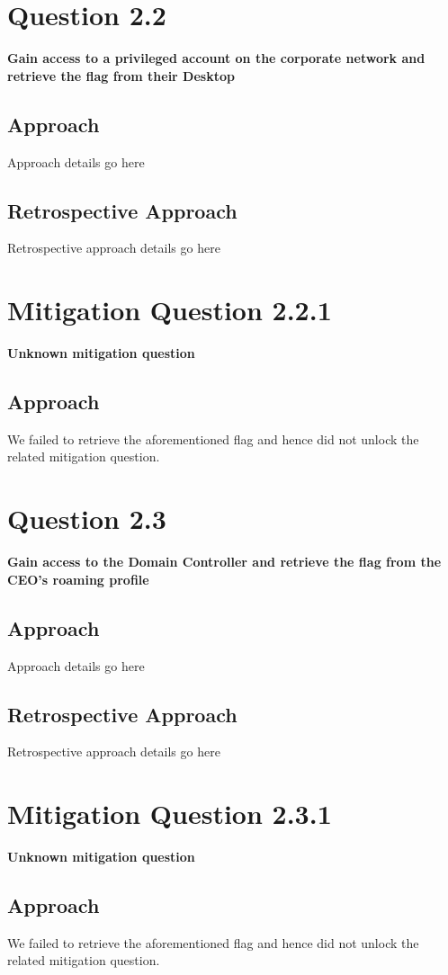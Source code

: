 \section{Question 2.2}
\textbf{Gain access to a privileged account on the corporate network and
retrieve the flag from their Desktop}
\subsection{Approach}
Approach details go here
\subsection{Retrospective Approach}
Retrospective approach details go here

\section{Mitigation Question 2.2.1}
\textbf{Unknown mitigation question}
\subsection{Approach}
We failed to retrieve the aforementioned flag and hence did not unlock the
related mitigation question.

\section{Question 2.3}
\textbf{Gain access to the Domain Controller and retrieve the flag from the
CEO's roaming profile}
\subsection{Approach}
Approach details go here
\subsection{Retrospective Approach}
Retrospective approach details go here

\section{Mitigation Question 2.3.1}
\textbf{Unknown mitigation question}
\subsection{Approach}
We failed to retrieve the aforementioned flag and hence did not unlock the
related mitigation question.
